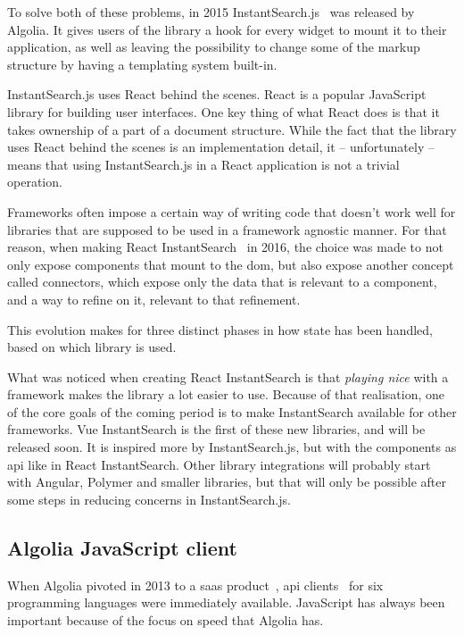To solve both of these problems, in 2015 InstantSearch.js~\cite{instantsearch-js} was released by Algolia. It gives users of the \gls{library} a hook for every widget to mount it to their application, as well as leaving the possibility to change some of the markup structure by having a templating system built-in.

InstantSearch.js uses React behind the scenes. React\cite{react-doc} is a popular JavaScript \gls{library} for building user interfaces. One key thing of what React does is that it takes ownership of a part of a document structure. While the fact that the \gls{library} uses React behind the scenes is an implementation detail, it -- unfortunately -- means that using InstantSearch.js in a React application is not a trivial operation.

Frameworks often impose a certain way of writing code that doesn't work well for libraries that are supposed to be used in a framework agnostic manner. For that reason, when making React InstantSearch~\cite{react-instantsearch} in 2016, the choice was made to not only expose components that mount to the \acrshort{dom}, but also expose another concept called connectors, which expose only the data that is relevant to a component, and a way to refine on it, relevant to that refinement.

This evolution makes for three distinct phases in how state has been handled, based on which \gls{library} is used.

What was noticed when creating React InstantSearch is that \emph{playing nice} with a framework makes the library a lot easier to use. Because of that realisation, one of the core goals of the coming period is to make InstantSearch available for other frameworks. Vue InstantSearch is the first of these new libraries, and will be released soon. It is inspired more by InstantSearch.js, but with the components as \acrshort{api} like in React InstantSearch. Other library integrations will probably start with Angular, Polymer and smaller libraries, but that will only be possible after some steps in reducing concerns in InstantSearch.js.

\subsection{Algolia JavaScript client} %
\label{sub:algolia_js_client}

When Algolia pivoted in 2013 to a \acrshort{saas} product~\cite{algolia-blog-saas}, \acrshort{api} clients~\cite{algolia-blog-lauch} for six programming languages were immediately available. JavaScript has always been important because of the focus on speed that Algolia has.

